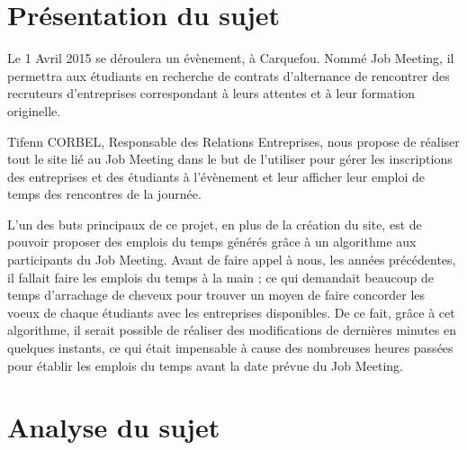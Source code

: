 \documentclass[12pt,a4paper]{article}
\begin{document}
\section{Présentation du sujet}

\begin{large}
\begin{onehalfspace}Le 1 Avril 2015 se déroulera un évènement, à Carquefou. Nommé Job Meeting, il permettra aux étudiants en recherche de contrats d’alternance de rencontrer des recruteurs d’entreprises correspondant à leurs attentes et à leur formation originelle.

	Tifenn CORBEL, Responsable des Relations Entreprises, nous propose de réaliser tout le site lié au Job Meeting dans le but de l’utiliser pour gérer les inscriptions des entreprises et des étudiants à l’évènement et leur afficher leur emploi de temps des rencontres de la journée.

	L’un des buts principaux de ce projet, en plus de la création du site, est de pouvoir proposer des emplois du temps générés grâce à un algorithme aux participants du Job Meeting. Avant de faire appel à nous, les années précédentes, il fallait faire les emplois du temps à la main ; ce qui demandait beaucoup de temps d’arrachage de cheveux pour trouver un moyen de faire concorder les voeux de chaque étudiants avec les entreprises disponibles. De ce fait, grâce à cet algorithme, il serait possible de réaliser des modifications de dernières minutes en quelques instants, ce qui était impensable à cause des nombreuses heures passées pour établir les emplois du temps avant la date prévue du Job Meeting.
\end{onehalfspace}
\end{large}


\newpage
\section{Analyse du sujet}
\end{document}
